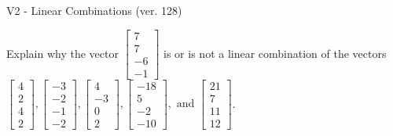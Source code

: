 \begin{exercise}
  \begin{exerciseTitle}V2 - Linear Combinations (ver. 128)\end{exerciseTitle}
  \begin{exerciseStatement}
    Explain why the vector \(\left[\begin{array}{c}
7 \\
7 \\
-6 \\
-1
\end{array}\right]\)  is or is not a linear 
	combination of the vectors \(\left[\begin{array}{c}
4 \\
2 \\
4 \\
2
\end{array}\right] , \left[\begin{array}{c}
-3 \\
-2 \\
-1 \\
-2
\end{array}\right] , \left[\begin{array}{c}
4 \\
-3 \\
0 \\
2
\end{array}\right] , \left[\begin{array}{c}
-18 \\
5 \\
-2 \\
-10
\end{array}\right] , \text{ and } \left[\begin{array}{c}
21 \\
7 \\
11 \\
12
\end{array}\right]\).
	



\end{exerciseStatement}
\end{exercise}
